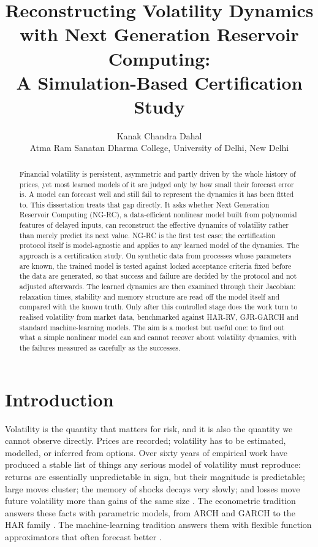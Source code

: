 \documentclass[12pt,a4paper]{article}
\title{\Large\bfseries Reconstructing Volatility Dynamics with Next
Generation Reservoir Computing:\\ A Simulation-Based Certification Study}
\author{Kanak Chandra Dahal\\
\small Atma Ram Sanatan Dharma College, University of Delhi, New Delhi}
\date{}
\begin{document}
\maketitle

\begin{abstract}
\noindent Financial volatility is persistent, asymmetric and partly driven
by the whole history of prices, yet most learned models of it are judged
only by how small their forecast error is. A model can forecast well and
still fail to represent the dynamics it has been fitted to. This
dissertation treats that gap directly. It asks whether Next Generation
Reservoir Computing (NG-RC), a data-efficient nonlinear model built from
polynomial features of delayed inputs, can reconstruct the effective
dynamics of volatility rather than merely predict its next value. NG-RC
is the first test case; the certification protocol itself is
model-agnostic and applies to any learned model of the dynamics. The
approach is a certification study. On synthetic data from processes whose
parameters are known, the trained model is tested against locked
acceptance criteria fixed before the data are generated, so that success
and failure are decided by the protocol and not adjusted afterwards. The
learned dynamics are then examined through their Jacobian: relaxation
times, stability and memory structure are read off the model itself and
compared with the known truth. Only after this controlled stage does the
work turn to realised volatility from market data, benchmarked against
HAR-RV, GJR-GARCH and standard machine-learning models. The aim is a modest but useful one: to find out
what a simple nonlinear model can and cannot recover about volatility
dynamics, with the failures measured as carefully as the successes.
\end{abstract}

\newpage

\section{Introduction}

Volatility is the quantity that matters for risk, and it is also the
quantity we cannot observe directly. Prices are recorded; volatility has
to be estimated, modelled, or inferred from options. Over sixty years of
empirical work have produced a stable list of things any serious model of
volatility must reproduce: returns are essentially unpredictable in sign,
but their magnitude is predictable; large moves cluster; the memory of
shocks decays very slowly; and losses move future volatility more than
gains of the same size \citep{mandelbrot1963,cont2001,ding1993,
bekaertwu2000}. The econometric tradition answers these facts with
parametric models, from ARCH and GARCH to the HAR family
\citep{engle1982,bollerslev1986,corsi2009}. The machine-learning tradition
answers them with flexible function approximators that often forecast
better \citep{bucci2020,christensen2023}.
\end{document}
